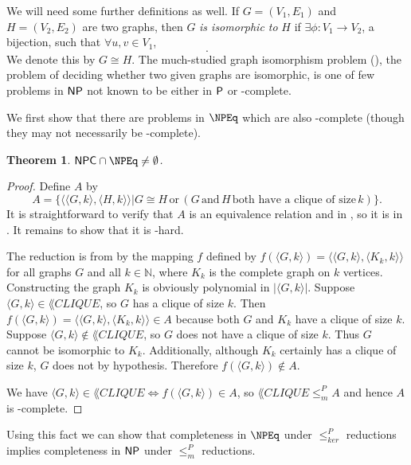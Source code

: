 \documentclass[draft]{article}
\newtheorem{theorem}{Theorem}[section]
\theoremstyle{definition} \newtheorem{openproblem}[openproblem]{Open problem}
\theoremstyle{definition} \newtheorem{definition}[definition]{Definition}
\theoremstyle{remark} \newtheorem{remark}{Remark}
\newcommand{\plain}[1]{\,\text{#1}\,} %
\newcommand{\kr}{\leq^{P}_{ker}} %
\newcommand{\mor}{\leq^{P}_{m}} %
\newcommand{\defn}[1]{\emph{#1}} %
\newcommand{\pair}[2]{\langle#1,#2\rangle} %
\begin{document}
We will need some further definitions as well.
If $G=(V_1,E_1)$ and $H=(V_2, E_2)$ are two graphs, then $G$ \defn{is isomorphic to} $H$ if $\exists\phi\colon V_1\to V_2$, a bijection, such that $\forall u,v\in V_1$,
\begin{displaymath}
  [(u,v)\in E_1\iff (\phi(u), \phi(v))\in E_2].
\end{displaymath}
We denote this by $G\cong H$.
The much-studied graph isomorphism problem (\GI), the problem of deciding whether two given graphs are isomorphic, is one of few problems in $\NP$ not known to be either in $\P$ or \NP-complete.

We first show that there are problems in $\NPEq$ which are also \NP-complete (though they may not necessarily be \NPEq-complete).

\begin{theorem}\label{thm:npcnpeq}
  $\NPC\cap\NPEq\neq\emptyset$.
\end{theorem}
\begin{proof}
  Define $A$ by
  \begin{displaymath}
    A=\{\pair{\pair{G}{k}}{\pair{H}{k}}|G\cong H \plain{or} (G \plain{and} H \plain{both have a clique of size} k)\}.
  \end{displaymath}
  It is straightforward to verify that $A$ is an equivalence relation and in \NP, so it is in \NPEq.
  It remains to show that it is \NP-hard.

  The reduction is from  by the mapping $f$ defined by $f(\pair{G}{k})=\pair{\pair{G}{k}}{\pair{K_k}{k}}$ for all graphs $G$ and all $k\in\mathbb{N}$, where $K_k$ is the complete graph on $k$ vertices.
  Constructing the graph $K_k$ is obviously polynomial in $|\pair{G}{k}|$.
  Suppose $\pair{G}{k}\in \lang{CLIQUE}$, so $G$ has a clique of size $k$.
  Then $f(\pair{G}{k})=\pair{\pair{G}{k}}{\pair{K_k}{k}}\in A$ because both $G$ and $K_k$ have a clique of size $k$.
  Suppose $\pair{G}{k}\notin \lang{CLIQUE}$, so $G$ does not have a clique of size $k$.
  Thus $G$ cannot be isomorphic to $K_k$.
  Additionally, although $K_k$ certainly has a clique of size $k$, $G$ does not by hypothesis.
  Therefore $f(\pair{G}{k})\notin A$.

  We have $\pair{G}{k}\in \lang{CLIQUE} \iff f(\pair{G}{k})\in A$, so $\lang{CLIQUE}\mor A$ and hence $A$ is \NP-complete.
\end{proof}

Using this fact we can show that completeness in $\NPEq$ under $\kr$ reductions implies completeness in $\NP$ under $\mor$ reductions.
\end{document}
